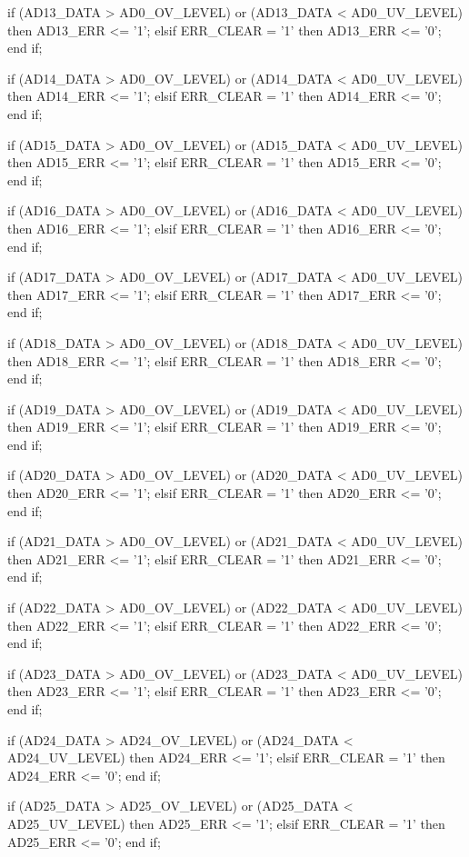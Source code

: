 \begin{mylisting}[language=VHDL,caption=AD変換モジュール,label=appF_ADC_module_VHDL]
				if (AD13_DATA > AD0_OV_LEVEL) or (AD13_DATA < AD0_UV_LEVEL) then
					AD13_ERR	<= '1';
				elsif ERR_CLEAR = '1' then
					AD13_ERR	<= '0';
				end if;
				
				if (AD14_DATA > AD0_OV_LEVEL) or (AD14_DATA < AD0_UV_LEVEL) then
					AD14_ERR	<= '1';
				elsif ERR_CLEAR = '1' then
					AD14_ERR	<= '0';
				end if;
				
				if (AD15_DATA > AD0_OV_LEVEL) or (AD15_DATA < AD0_UV_LEVEL) then
					AD15_ERR	<= '1';
				elsif ERR_CLEAR = '1' then
					AD15_ERR	<= '0';
				end if;
				
				if (AD16_DATA > AD0_OV_LEVEL) or (AD16_DATA < AD0_UV_LEVEL) then
					AD16_ERR	<= '1';
				elsif ERR_CLEAR = '1' then
					AD16_ERR	<= '0';
				end if;
				
				if (AD17_DATA > AD0_OV_LEVEL) or (AD17_DATA < AD0_UV_LEVEL) then
					AD17_ERR	<= '1';
				elsif ERR_CLEAR = '1' then
					AD17_ERR	<= '0';
				end if;
				
				if (AD18_DATA > AD0_OV_LEVEL) or (AD18_DATA < AD0_UV_LEVEL) then
					AD18_ERR	<= '1';
				elsif ERR_CLEAR = '1' then
					AD18_ERR	<= '0';
				end if;
				
				if (AD19_DATA > AD0_OV_LEVEL) or (AD19_DATA < AD0_UV_LEVEL) then
					AD19_ERR	<= '1';
				elsif ERR_CLEAR = '1' then
					AD19_ERR	<= '0';
				end if;
				
				
				
				if (AD20_DATA > AD0_OV_LEVEL) or (AD20_DATA < AD0_UV_LEVEL) then
					AD20_ERR	<= '1';
				elsif ERR_CLEAR = '1' then
					AD20_ERR	<= '0';
				end if;
				
				if (AD21_DATA > AD0_OV_LEVEL) or (AD21_DATA < AD0_UV_LEVEL) then
					AD21_ERR	<= '1';
				elsif ERR_CLEAR = '1' then
					AD21_ERR	<= '0';
				end if;
				
				if (AD22_DATA > AD0_OV_LEVEL) or (AD22_DATA < AD0_UV_LEVEL) then
					AD22_ERR	<= '1';
				elsif ERR_CLEAR = '1' then
					AD22_ERR	<= '0';
				end if;
				
				if (AD23_DATA > AD0_OV_LEVEL) or (AD23_DATA < AD0_UV_LEVEL) then
					AD23_ERR	<= '1';
				elsif ERR_CLEAR = '1' then
					AD23_ERR	<= '0';
				end if;
				
				if (AD24_DATA > AD24_OV_LEVEL) or (AD24_DATA < AD24_UV_LEVEL) then
					AD24_ERR	<= '1';
				elsif ERR_CLEAR = '1' then
					AD24_ERR	<= '0';
				end if;
				
				if (AD25_DATA > AD25_OV_LEVEL) or (AD25_DATA < AD25_UV_LEVEL) then
					AD25_ERR	<= '1';
				elsif ERR_CLEAR = '1' then
					AD25_ERR	<= '0';
				end if;
				

\end{mylisting}

